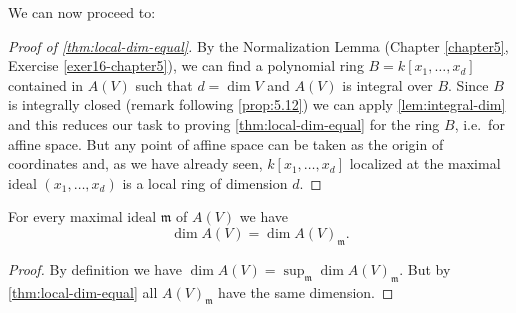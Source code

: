 We can now proceed to:

\begin{proof}[Proof of \eqref{thm:local-dim-equal}]
By the Normalization Lemma (Chapter \ref{chapter5}, Exercise \ref{exer16-chapter5}), we can find a polynomial ring $B = k[x_1, \ldots, x_d]$ contained in $A(V)$ such that $d = \dim V$ and $A(V)$ is integral over $B$. Since $B$ is integrally closed (remark following \eqref{prop:5.12}) we can apply \eqref{lem:integral-dim} and this reduces our task to proving \eqref{thm:local-dim-equal} for the ring $B$, i.e.\ for affine space. But any point of affine space can be taken as the origin of coordinates and, as we have already seen, $k[x_1, \ldots, x_d]$ localized at the maximal ideal $(x_1, \ldots, x_d)$ is a local ring of dimension $d$.
\end{proof}

\begin{corollary}\label{cor:dim-coordinate-ring}
For every maximal ideal $\mathfrak{m}$ of $A(V)$ we have
\[
    \dim A(V) = \dim A(V)_{\mathfrak{m}}.
\]
\end{corollary}

\begin{proof}
By definition we have $\dim A(V) = \sup_{\mathfrak{m}} \dim A(V)_{\mathfrak{m}}$. But by \eqref{thm:local-dim-equal} all $A(V)_{\mathfrak{m}}$ have the same dimension.
\end{proof}




